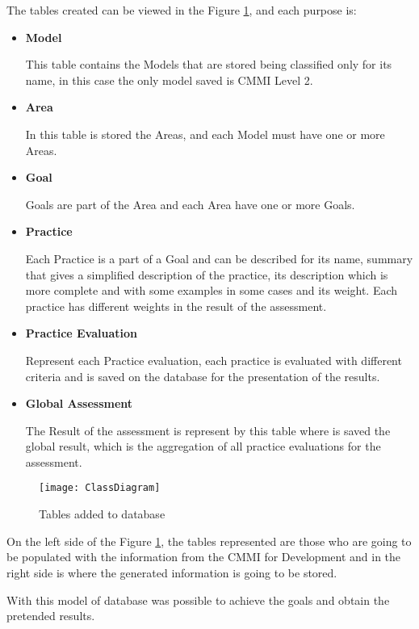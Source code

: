 The tables created can be viewed in the Figure \ref{fig:database}, and each purpose is:
\begin{itemize}
	\item \textbf{Model}
	
	This table contains the Models that are stored being classified only for its name, in this case the only model saved is CMMI Level 2.
	\item \textbf{Area}
	
	In this table is stored the Areas, and each Model must have one or more Areas.
	\item \textbf{Goal}
	
	Goals are part of the Area and each Area have one or more Goals.
	\item \textbf{Practice}
	
	Each Practice is a part of a Goal and can be described for its name, summary that gives a simplified description of the practice, its description which is more complete and with some examples in some cases and its weight. Each practice has different weights in the result of the assessment.
	
	\item \textbf{Practice Evaluation}
	
	Represent each Practice evaluation, each practice is evaluated with different criteria and is saved on the database for the presentation of the results.
	
	\item \textbf{Global Assessment}
	
	The Result of the assessment is represent by this table where is saved the global result, which is the aggregation of all practice evaluations for the assessment.
	
\end{itemize}

\begin{figure}[!htb]
	\begin{center}
		\leavevmode
		\texttt{[image: ClassDiagram]}
		\caption{Tables added to database}
		\label{fig:database}
	\end{center}
\end{figure}


On the left side of the Figure \ref{fig:database}, the tables represented are those who are going to be populated with the information from the CMMI for Development and in the right side is where the generated information is going to be stored.

With this model of database was possible to achieve the goals and obtain the pretended results.

